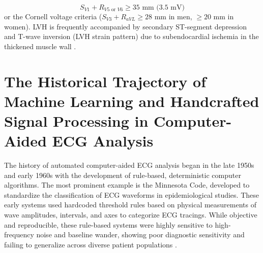 \documentclass[12pt,a4paper]{report}
\begin{document}
\begin{enumerate}
    \begin{equation}
        S_{V1} + R_{V5 \text{ or } V6} \ge 35 \text{ mm (3.5 mV)}
    \end{equation}
    or the Cornell voltage criteria ($S_{V3} + R_{aVL} \ge 28$ mm in men, $\ge 20$ mm in women). LVH is frequently accompanied by secondary ST-segment depression and T-wave inversion (LVH strain pattern) due to subendocardial ischemia in the thickened muscle wall \cite{schlapfer2017ecg, strodthoff2021deep}.
\end{enumerate}

\section{The Historical Trajectory of Machine Learning and Handcrafted Signal Processing in Computer-Aided ECG Analysis}
The history of automated computer-aided ECG analysis began in the late 1950s and early 1960s with the development of rule-based, deterministic computer algorithms. The most prominent example is the Minnesota Code, developed to standardize the classification of ECG waveforms in epidemiological studies. These early systems used hardcoded threshold rules based on physical measurements of wave amplitudes, intervals, and axes to categorize ECG tracings. While objective and reproducible, these rule-based systems were highly sensitive to high-frequency noise and baseline wander, showing poor diagnostic sensitivity and failing to generalize across diverse patient populations \cite{ebrahimi2020review}.
\end{document}
